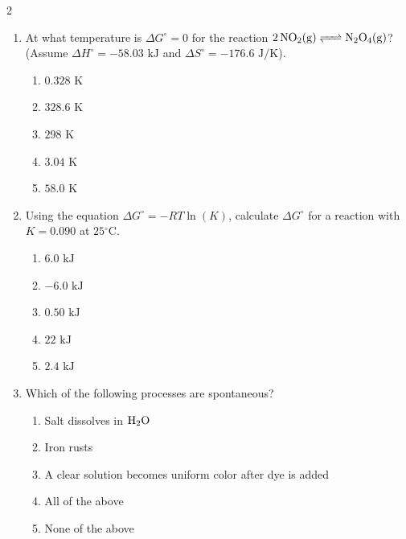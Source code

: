 \documentclass[12pt,letterpaper]{article}
\begin{document}
\begin{multicols*}{2}
\begin{enumerate}
        \item At what temperature is $\Delta G^\circ = 0$ for the reaction $\ce{2NO2(g) <=> N2O4(g)}$? (Assume $\Delta H^\circ = -58.03\text{ kJ}$ and $\Delta S^\circ = -176.6\text{ J/K}$). %
            \begin{enumerate}
                \item $0.328\text{ K}$
                \item $328.6\text{ K}$
                \item $298\text{ K}$
                \item $3.04\text{ K}$
                \item $58.0\text{ K}$
            \end{enumerate}
        \columnbreak
        \item Using the equation $\Delta G^\circ = -RT\ln(K)$, calculate $\Delta G^\circ$ for a reaction with $K = 0.090$ at $25\text{}^\circ\text{C}$. %
            \begin{enumerate}
                \item $6.0\text{ kJ}$
                \item $-6.0\text{ kJ}$
                \item $0.50\text{ kJ}$
                \item $22\text{ kJ}$
                \item $2.4\text{ kJ}$
            \end{enumerate}

        \item Which of the following processes are spontaneous? %
            \begin{enumerate}
                \item Salt dissolves in $\ce{H2O}$
                \item Iron rusts
                \item A clear solution becomes uniform color after dye is added
                \item All of the above
                \item None of the above
            \end{enumerate}


\end{enumerate}
\end{multicols*}
\end{document}

